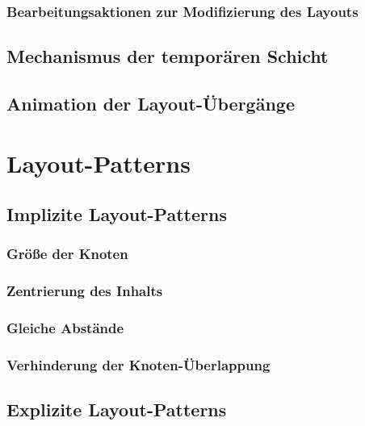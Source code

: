 \subsubsection{Bearbeitungsaktionen zur Modifizierung des Layouts}

\subsection{Mechanismus der temporären Schicht}
\label{subsec:temporary-layer-mechanism}

\subsection{Animation der Layout-Übergänge}
\label{subsec:animation-interaction}


\section{Layout-Patterns}
\label{sec:layout-patterns}

\subsection{Implizite Layout-Patterns}
\label{subsec:implicit-layout-patterns}

\subsubsection{Größe der Knoten}
\subsubsection{Zentrierung des Inhalts}
\subsubsection{Gleiche Abstände}
\subsubsection{Verhinderung der Knoten-Überlappung}

\subsection{Explizite Layout-Patterns}
\label{subsec:explicit-layout-patterns}

